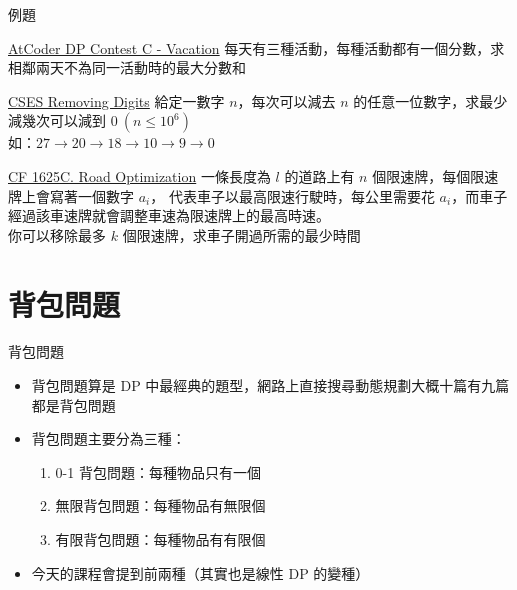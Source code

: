 \documentclass[aspectratio=169]{beamer}
\begin{document}
    \begin{frame}{例題}
        \begin{block}{\href{https://atcoder.jp/contests/dp/tasks/dp_c}{AtCoder DP Contest C - Vacation}}
            每天有三種活動，每種活動都有一個分數，求相鄰兩天不為同一活動時的最大分數和
        \end{block}

        \begin{block}{\href{https://cses.fi/problemset/task/1637}{CSES Removing Digits}}
            給定一數字 $n$，每次可以減去 $n$ 的任意一位數字，求最少減幾次可以減到 $0\ (n \le 10^6)$ \\
            如：$27 \rightarrow 20 \rightarrow 18 \rightarrow 10 \rightarrow 9 \rightarrow 0$
        \end{block}

        \begin{block}{\href{https://codeforces.com/contest/1625/problem/C}{CF 1625C. Road Optimization}}
            一條長度為 $l$ 的道路上有 $n$ 個限速牌，每個限速牌上會寫著一個數字 $a_i$，
            代表車子以最高限速行駛時，每公里需要花 $a_i$，而車子經過該車速牌就會調整車速為限速牌上的最高時速。\\
            你可以移除最多 $k$ 個限速牌，求車子開過所需的最少時間
        \end{block}
    \end{frame}

    \section{背包問題}

    \begin{frame}{背包問題}
        \begin{itemize}
            \item 背包問題算是 DP 中最經典的題型，網路上直接搜尋動態規劃大概十篇有九篇都是背包問題
            \item 背包問題主要分為三種：
            \begin{enumerate}
                \item 0-1 背包問題：每種物品只有一個
                \item 無限背包問題：每種物品有無限個
                \item 有限背包問題：每種物品有有限個
            \end{enumerate}
            \item 今天的課程會提到前兩種（其實也是線性 DP 的變種）
        \end{itemize}
    \end{frame}
\end{document}
